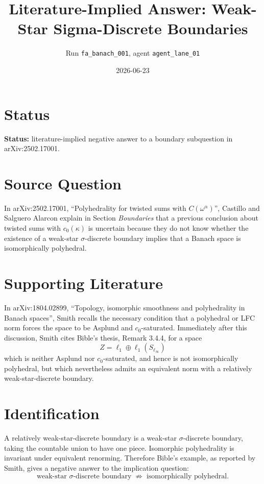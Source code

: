 \documentclass[11pt]{article}
\title{Literature-Implied Answer: Weak-Star Sigma-Discrete Boundaries}
\author{Run \texttt{fa\_banach\_001}, agent \texttt{agent\_lane\_01}}
\date{2026-06-23}
\begin{document}
\maketitle

\section*{Status}

\textbf{Status:} literature-implied negative answer to a boundary subquestion in
arXiv:2502.17001.

\section*{Source Question}

In arXiv:2502.17001, ``Polyhedrality for twisted sums with
$C(\omega^\alpha)$'', Castillo and Salguero Alarcon explain in Section
\emph{Boundaries} that a previous conclusion about twisted sums with
$c_0(\kappa)$ is uncertain because they do not know whether the existence of a
weak-star $\sigma$-discrete boundary implies that a Banach space is
isomorphically polyhedral.

\section*{Supporting Literature}

In arXiv:1804.02899, ``Topology, isomorphic smoothness and polyhedrality in
Banach spaces'', Smith recalls the necessary condition that a polyhedral or LFC
norm forces the space to be Asplund and $c_0$-saturated.  Immediately after
this discussion, Smith cites Bible's thesis, Remark 3.4.4, for a space
\[
  Z=\ell_1 \oplus \ell_1(S_{\ell_\infty})
\]
which is neither Asplund nor $c_0$-saturated, and hence is not isomorphically
polyhedral, but which nevertheless admits an equivalent norm with a relatively
weak-star-discrete boundary.

\section*{Identification}

A relatively weak-star-discrete boundary is a weak-star
$\sigma$-discrete boundary, taking the countable union to have one piece.
Isomorphic polyhedrality is invariant under equivalent renorming.  Therefore
Bible's example, as reported by Smith, gives a negative answer to the implication
question:
\[
  \text{weak-star $\sigma$-discrete boundary}
  \;\nRightarrow\;
  \text{isomorphically polyhedral}.
\]
\end{document}
